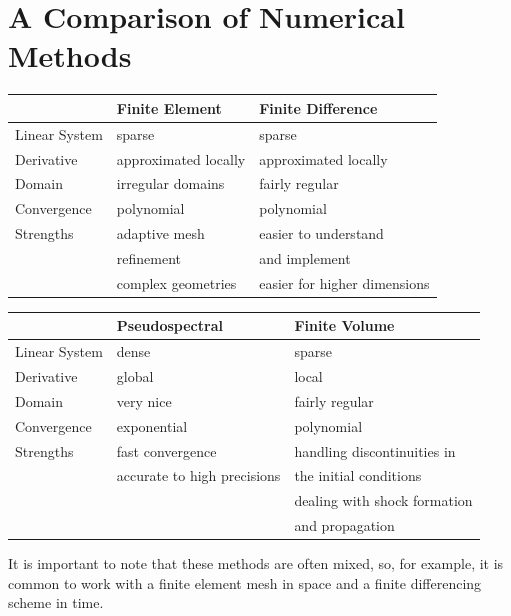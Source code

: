 \section*{A Comparison of Numerical Methods}

\begin{center}
  \begin{tabular}{ l |l l }
     & Finite Element & Finite Difference  \\ \hline
    Linear System& sparse& sparse  \\
   Derivative & approximated locally & approximated locally \\
Domain & irregular domains & fairly regular\\
Convergence & polynomial & polynomial \\
Strengths & adaptive mesh & easier to understand \\
& refinement & and implement \\
& complex geometries & easier for higher dimensions \\
    \hline
  \end{tabular}
\end{center}

\begin{center}
  \begin{tabular}{ l |l l }
      & Pseudospectral & Finite Volume \\ \hline
    Linear System & dense & sparse \\
   Derivative & global & local\\
Domain  & very nice & fairly regular\\
Convergence  & exponential & polynomial\\
Strengths  & fast convergence & handling discontinuities in \\
& accurate to high precisions &the initial conditions \\
& & dealing with shock formation \\
& & and propagation \\
    \hline
  \end{tabular}
\end{center}

It is important to note that these methods are often mixed, so, for example, it is common to work with a finite element mesh in space and a finite differencing scheme in time.